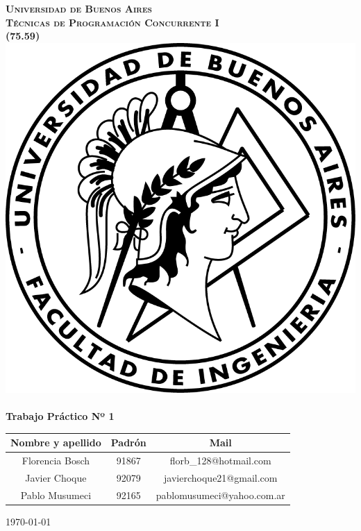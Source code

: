 \begin{titlepage}
\begin{center}


\textsc{\LARGE \textbf{Universidad de Buenos Aires}}\\%
\vfill
\textsc{\LARGE \textbf{Técnicas de Programación Concurrente I }}\\%
\vfill
\textsc{\LARGE \textbf{(75.59)}}\\%
\vfill
\vfill
\includegraphics[scale=1.25]{./logo.png}~\\[2cm]
{ \huge \bfseries Trabajo Práctico Nº 1}\\%
\vfill
{\Large
\begin{tabular}{|c|c|c|}
\hline
Nombre y apellido & Padrón & Mail \\
\hline
Florencia Bosch & 91867 & florb\_128@hotmail.com \\
\hline
Javier Choque & 92079 & javierchoque21@gmail.com \\
\hline
Pablo Musumeci & 92165 & pablomusumeci@yahoo.com.ar\\
\hline
\end{tabular}
}
\vfill

{\large \today}

\end{center}
\end{titlepage}
